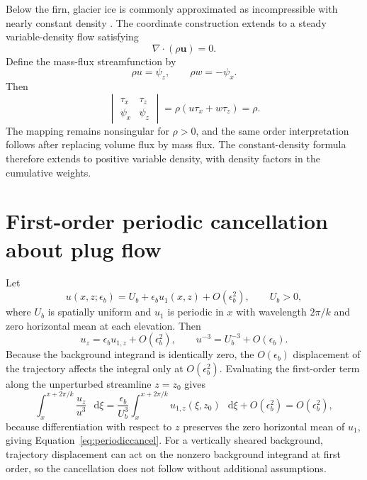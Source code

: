 \documentclass[review]{igs}
\providecommand{\DIFaddbegin}{} %
\providecommand{\DIFaddend}{} %
\newcommand{\DIFaddincludegraphics}[2][]{{\color{blue}\fbox{\DIFOincludegraphics[#1]{#2}}}} %
\DeclareRobustCommand{\DIFaddbegin}{\DIFOaddbegin \let\includegraphics\DIFaddincludegraphics} %
\DeclareRobustCommand{\DIFaddend}{\DIFOaddend \let\includegraphics\DIFOincludegraphics} %
\begin{document}
Below the firn, glacier ice is commonly approximated as incompressible with nearly constant density \citep{lipovsky2022density}. The coordinate construction extends to a steady variable-density flow satisfying
\begin{equation}
\nabla\cdot(\rho\bm{u})=0.
\end{equation}
Define the mass-flux streamfunction by
\begin{equation}
\rho u=\psi_z,
\qquad
\rho w=-\psi_x.
\end{equation}
Then
\begin{equation}
\begin{vmatrix}
\tau_x & \tau_z \\
\psi_x & \psi_z
\end{vmatrix}
=\rho(u\tau_x+w\tau_z)=\rho.
\end{equation}
The mapping remains nonsingular for \(\rho>0\), and the same order interpretation follows after replacing volume flux by mass flux. The constant-density formula therefore extends to positive variable density, with density factors in the cumulative weights.

\section{First-order periodic cancellation about plug flow}
\DIFaddbegin \label{app:periodic}
\DIFaddend 

Let
\begin{equation}
 u(x,z;\epsilon_b)=U_b+\epsilon_b u_1(x,z)+O(\epsilon_b^2),
 \qquad U_b>0,
\end{equation}
where \(U_b\) is spatially uniform and \(u_1\) is periodic in \(x\) with wavelength \(2\pi/k\) and zero horizontal mean at each elevation. Then
\begin{equation}
 u_z=\epsilon_b u_{1,z}+O(\epsilon_b^2),
 \qquad
 u^{-3}=U_b^{-3}+O(\epsilon_b).
\end{equation}
Because the background integrand is identically zero, the \(O(\epsilon_b)\) displacement of the trajectory affects the integral only at \(O(\epsilon_b^2)\). Evaluating the first-order term along the unperturbed streamline \(z=z_0\) gives
\begin{equation}
\int_x^{x+2\pi/k}\frac{u_z}{u^3}\,\mathop{}\!\mathrm{d}\xi
=\frac{\epsilon_b}{U_b^3}
\int_x^{x+2\pi/k}u_{1,z}(\xi,z_0)\,\mathop{}\!\mathrm{d}\xi
+O(\epsilon_b^2)
=O(\epsilon_b^2),
\end{equation}
because differentiation with respect to \(z\) preserves the zero horizontal mean of \(u_1\), giving Equation~\ref{eq:periodiccancel}. For a vertically sheared background, trajectory displacement can act on the nonzero background integrand at first order, so the cancellation does not follow without additional assumptions.
\DIFaddbegin 
\end{document}
